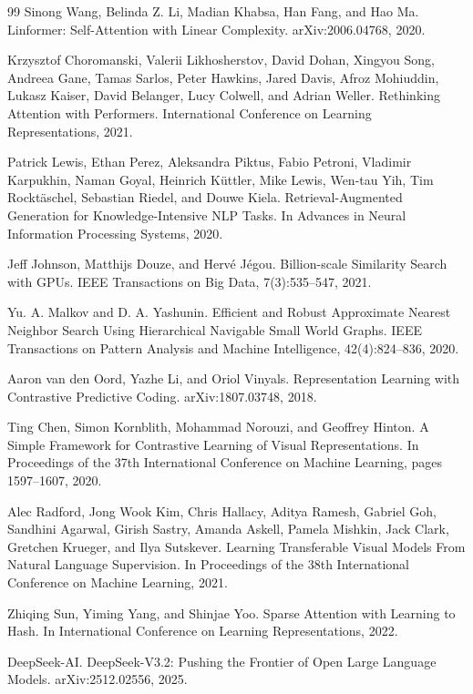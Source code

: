 \documentclass{article}
\begin{document}
\begin{thebibliography}{99}
Sinong Wang, Belinda Z. Li, Madian Khabsa, Han Fang, and Hao Ma.
Linformer: Self-Attention with Linear Complexity.
arXiv:2006.04768, 2020.

Krzysztof Choromanski, Valerii Likhosherstov, David Dohan, Xingyou Song, Andreea Gane, Tamas Sarlos, Peter Hawkins, Jared Davis, Afroz Mohiuddin, Lukasz Kaiser, David Belanger, Lucy Colwell, and Adrian Weller.
Rethinking Attention with Performers.
International Conference on Learning Representations, 2021.

Patrick Lewis, Ethan Perez, Aleksandra Piktus, Fabio Petroni, Vladimir Karpukhin, Naman Goyal, Heinrich K\"uttler, Mike Lewis, Wen-tau Yih, Tim Rockt\"aschel, Sebastian Riedel, and Douwe Kiela.
Retrieval-Augmented Generation for Knowledge-Intensive NLP Tasks.
In Advances in Neural Information Processing Systems, 2020.

Jeff Johnson, Matthijs Douze, and Herv\'e J\'egou.
Billion-scale Similarity Search with GPUs.
IEEE Transactions on Big Data, 7(3):535--547, 2021.

Yu. A. Malkov and D. A. Yashunin.
Efficient and Robust Approximate Nearest Neighbor Search Using Hierarchical Navigable Small World Graphs.
IEEE Transactions on Pattern Analysis and Machine Intelligence, 42(4):824--836, 2020.

Aaron van den Oord, Yazhe Li, and Oriol Vinyals.
Representation Learning with Contrastive Predictive Coding.
arXiv:1807.03748, 2018.

Ting Chen, Simon Kornblith, Mohammad Norouzi, and Geoffrey Hinton.
A Simple Framework for Contrastive Learning of Visual Representations.
In Proceedings of the 37th International Conference on Machine Learning, pages 1597--1607, 2020.

Alec Radford, Jong Wook Kim, Chris Hallacy, Aditya Ramesh, Gabriel Goh, Sandhini Agarwal, Girish Sastry, Amanda Askell, Pamela Mishkin, Jack Clark, Gretchen Krueger, and Ilya Sutskever.
Learning Transferable Visual Models From Natural Language Supervision.
In Proceedings of the 38th International Conference on Machine Learning, 2021.

Zhiqing Sun, Yiming Yang, and Shinjae Yoo.
Sparse Attention with Learning to Hash.
In International Conference on Learning Representations, 2022.

DeepSeek-AI.
DeepSeek-V3.2: Pushing the Frontier of Open Large Language Models.
arXiv:2512.02556, 2025.


\end{thebibliography}
\end{document}
